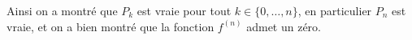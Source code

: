\documentclass[a4paper, 11pt,reqno]{article}
\begin{document}
\begin{correction}
	Ainsi on a montr\'e que $P_k$ est vraie pour tout $k \in \{0, \ldots, n\}$, en particulier $P_n$ est vraie, et on a bien montr\'e que la fonction $f^{(n)}$ admet un z\'ero.
\end{correction}
\end{document}
